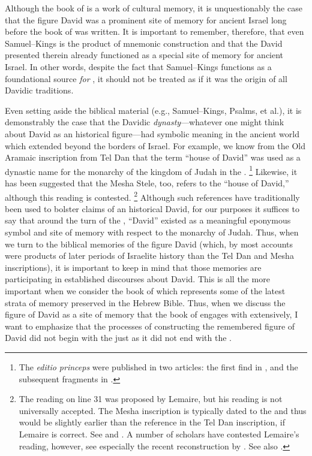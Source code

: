 Although the book of \chronicles is a work of cultural memory, it is unquestionably the case that the figure David was a prominent site of memory for ancient Israel long before the book of \chronicles was written. It is important to remember, therefore, that even Samuel--Kings is the product of mnemonic construction and that the David presented therein already functioned as a special site of memory for ancient Israel. In other words, despite the fact that Samuel--Kings functions as a foundational source \emph{for \chronicles}, it should not be treated as if it was the origin of all Davidic traditions.\autocite{frohlich_frohlich2019}

Even setting aside the biblical material (e.g., Samuel--Kings, Psalms, et al.), it is demonstrably the case that the Davidic \emph{dynasty}---whatever one might think about David as an historical figure---had symbolic meaning in the ancient world which extended beyond the borders of Israel. For example, we know from the Old Aramaic inscription from Tel Dan that the term  ``house of David'' was used as a dynastic name for the monarchy of the kingdom of Judah in the .%
    \footnote{The \emph{editio princeps} were published in two articles: the first find in \cite{biran-naveh_iej1993}, and the subsequent fragments in \cite{biran-naveh_iej1995}.}
Likewise, it has been suggested that the Mesha Stele, too, refers to the ``house of David,'' although this reading is contested.%
    \footnote{The reading  on line 31 was proposed by Lemaire, but his reading is not universally accepted. The Mesha inscription is typically dated to the  and thus would be slightly earlier than the reference in the Tel Dan inscription, if Lemaire is correct. See \cite{lemaire_sel1994} and \cite{lemaire_bar1994}. A number of scholars have contested Lemaire's reading, however, see especially the recent reconstruction by \cite{finkelstein-etal_ta2019}. See also \cite[164 n. 792]{parker2018}.}
Although such references have traditionally been used to bolster claims of an historical David, for our purposes it suffices to say that around the turn of the , ``David'' existed as a meaningful eponymous symbol and site of memory with respect to the monarchy of Judah. Thus, when we turn to the biblical memories of the figure David (which, by most accounts were products of later periods of Israelite history than the Tel Dan and Mesha inscriptions), it is important to keep in mind that those memories are participating in established discourses about David. This is all the more important when we consider the book of \chronicles which represents some of the latest strata of memory preserved in the Hebrew Bible. Thus, when we discuss the figure of David as a site of memory that the book of \chronicles engages with extensively, I want to emphasize that the processes of constructing the remembered figure of David did not begin with the \chronicler just as it did not end with the \chronicler.\autocite{frohlich_frohlich2019}

